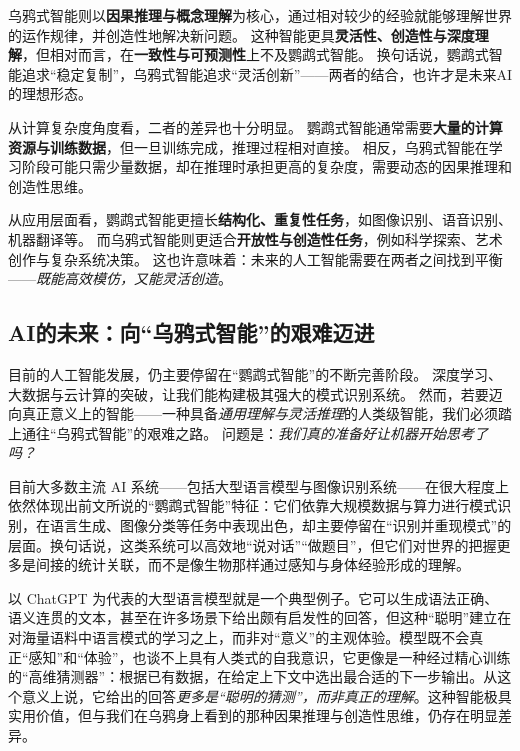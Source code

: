乌鸦式智能则以\textbf{因果推理与概念理解}为核心，通过相对较少的经验就能够理解世界的运作规律，并创造性地解决新问题。
这种智能更具\textbf{灵活性、创造性与深度理解}，但相对而言，在\textbf{一致性与可预测性}上不及鹦鹉式智能。  
换句话说，鹦鹉式智能追求“稳定复制”，乌鸦式智能追求“灵活创新”——两者的结合，也许才是未来AI的理想形态。  

从计算复杂度角度看，二者的差异也十分明显。  
鹦鹉式智能通常需要\textbf{大量的计算资源与训练数据}，但一旦训练完成，推理过程相对直接。  
相反，乌鸦式智能在学习阶段可能只需少量数据，却在推理时承担更高的复杂度，需要动态的因果推理和创造性思维。

从应用层面看，鹦鹉式智能更擅长\textbf{结构化、重复性任务}，如图像识别、语音识别、机器翻译等。  
而乌鸦式智能则更适合\textbf{开放性与创造性任务}，例如科学探索、艺术创作与复杂系统决策。  
这也许意味着：未来的人工智能需要在两者之间找到平衡——\emph{既能高效模仿，又能灵活创造}。  

\subsection{AI的未来：向“乌鸦式智能”的艰难迈进}

目前的人工智能发展，仍主要停留在“鹦鹉式智能”的不断完善阶段。  
深度学习、大数据与云计算的突破，让我们能构建极其强大的模式识别系统。  
然而，若要迈向真正意义上的智能——一种具备\emph{通用理解与灵活推理}的人类级智能，我们必须踏上通往“乌鸦式智能”的艰难之路。  
问题是：\emph{我们真的准备好让机器开始思考了吗？}  

目前大多数主流 AI 系统——包括大型语言模型与图像识别系统——在很大程度上依然体现出前文所说的“鹦鹉式智能”特征：它们依靠大规模数据与算力进行模式识别，在语言生成、图像分类等任务中表现出色，却主要停留在“识别并重现模式”的层面。换句话说，这类系统可以高效地“说对话”“做题目”，但它们对世界的把握更多是间接的统计关联，而不是像生物那样通过感知与身体经验形成的理解。

以 ChatGPT 为代表的大型语言模型就是一个典型例子。它可以生成语法正确、语义连贯的文本，甚至在许多场景下给出颇有启发性的回答，但这种“聪明”建立在对海量语料中语言模式的学习之上，而非对“意义”的主观体验。模型既不会真正“感知”和“体验”，也谈不上具有人类式的自我意识，它更像是一种经过精心训练的“高维猜测器”：根据已有数据，在给定上下文中选出最合适的下一步输出。从这个意义上说，它给出的回答\emph{更多是“聪明的猜测”，而非真正的理解}。这种智能极具实用价值，但与我们在乌鸦身上看到的那种因果推理与创造性思维，仍存在明显差异。

